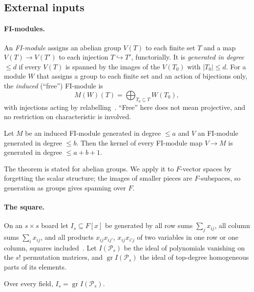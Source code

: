 \subsection{External inputs}\label{sec:growth-inputs}

\paragraph{FI-modules.}  An \emph{FI-module} assigns an abelian group $V(T)$ to each finite
set $T$ and a map $V(T)\to V(T')$ to each injection $T\hookrightarrow T'$, functorially.  It
is \emph{generated in degree $\le d$} if every $V(T)$ is spanned by the images of the
$V(T_0)$ with $|T_0|\le d$.  For a module $W$ that assigns a group to each finite set and
an action of bijections only, the \emph{induced} (``free'') FI-module is
\[
  M(W)(T)=\bigoplus_{T_0\subseteq T}W(T_0),
\]
with injections acting by relabelling~\cite[\S2.1, eq.~(2)]{churchellenberg}.  ``Free''
here does not mean projective, and no restriction on characteristic is involved.

\begin{theorem}\label{thm:ce}
Let $M$ be an induced FI-module generated in degree $\le a$ and $V$ an FI-module generated
in degree $\le b$.  Then the kernel of every FI-module map $V\to M$ is generated in degree
$\le a+b+1$.
\end{theorem}

The theorem is stated for abelian groups.  We apply it to $F$-vector spaces by forgetting
the scalar structure; the images of smaller pieces are $F$-subspaces, so generation as
groups gives spanning over $F$.

\paragraph{The square.}  On an $s\times s$ board let $I_s\subseteq F[x]$ be generated by all
row sums $\sum_jx_{ij}$, all column sums $\sum_ix_{ij}$, and all products $x_{ij}x_{ij'}$,
$x_{ij}x_{i'j}$ of two variables in one row or one column, squares
included~\cite[Def.~1.1]{rhoades2024}.  Let $I(\mathcal P_s)$ be the ideal of polynomials
vanishing on the $s!$ permutation matrices, and $\operatorname{gr}I(\mathcal P_s)$ the ideal
of top-degree homogeneous parts of its elements.

\begin{theorem}\label{thm:rhoades}
Over every field, $I_s=\operatorname{gr}I(\mathcal P_s)$.
\end{theorem}

